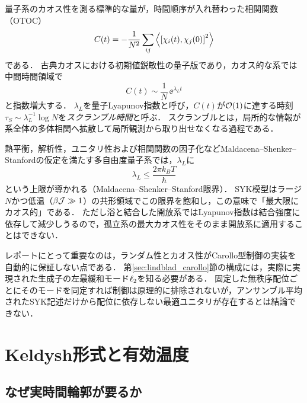 \documentclass[a4paper,11pt,onecolumn]{jlreq}
\begin{document}
量子系のカオス性を測る標準的な量が，時間順序が入れ替わった相関関数（OTOC）
\begin{equation}
  C(t) = -\frac{1}{N^2}\sum_{ij}
    \expval{\comm{\chi_i(t)}{\chi_j(0)}^2}
  \label{eq:otoc}
\end{equation}
である．
古典カオスにおける初期値鋭敏性の量子版であり，カオス的な系では中間時間領域で
\begin{equation}
  C(t) \sim \frac{1}{N}\,\ee^{\lambda_L t}
  \label{eq:lyapunov}
\end{equation}
と指数増大する．
$\lambda_L$を量子Lyapunov指数と呼び，$C(t)$が$\order{1}$に達する時刻$\tau_S\sim\lambda_L^{-1}\log N$を\emph{スクランブル時間}と呼ぶ．
スクランブルとは，局所的な情報が系全体の多体相関へ拡散して局所観測から取り出せなくなる過程である．

熱平衡，解析性，ユニタリ性および相関関数の因子化などMaldacena--Shenker--Stanfordの仮定を満たす多自由度量子系では，$\lambda_L$に
\begin{equation}
  \lambda_L \le \frac{2\pi k_B T}{\hbar}
  \label{eq:chaos_bound}
\end{equation}
という上限が導かれる（Maldacena--Shenker--Stanford限界）\cite{Maldacena2016}．
SYK模型はラージ$N$かつ低温（$\beta\mathcal{J}\gg1$）の共形領域でこの限界を飽和し\cite{MaldacenaStanford2016}，この意味で「最大限にカオス的」である．
ただし浴と結合した開放系ではLyapunov指数は結合強度に依存して減少しうるので，孤立系の最大カオス性をそのまま開放系に適用することはできない．

レポートにとって重要なのは，ランダム性とカオス性がCarollo型制御の実装を自動的に保証しない点である．
第\ref{sec:lindblad_carollo}節の構成には，実際に実現された生成子の左最緩和モード$\ell_{2}$を知る必要がある．
固定した無秩序配位ごとにそのモードを同定すれば制御は原理的に排除されないが，アンサンブル平均されたSYK記述だけから配位に依存しない最適ユニタリが存在するとは結論できない．

\section{Keldysh形式と有効温度}
\label{sec:keldysh}

\subsection{なぜ実時間輪郭が要るか}
\label{sec:keldysh_why}
\end{document}
